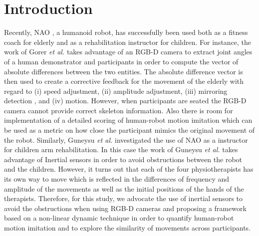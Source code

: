 \documentclass{sig-alternate-05-2015}
\begin{document}


%
%

%
%
\printccsdesc



\section{Introduction}
Recently, NAO \cite{Gouaillier2009}, a humanoid robot, has successfully been used 
both as a fitness coach for elderly and as a rehabilitation instructor for children.
For instance, the work of Gorer \textit{et al.} \cite{Gorer2016} 
takes advantage of an RGB-D camera to extract joint angles of a human demonstrator and participants 
in order to compute the vector of absolute differences between the two entities. 
The absolute difference vector is then used to create a corrective feedback for the movement
of the elderly  with regard to (i) speed adjustment, (ii) amplitude adjustment, (iii) mirroring detection
, and (iv) motion.
However, when participants are seated the RGB-D camera cannot provide correct skeleton information.
Also there is room for implementation of a detailed scoring 
of human-robot motion imitation which can be used as a metric on how close the participant mimics the original movement 
of the robot.
Similarly, Guneysu \textit{et al.} \cite{Guneysu2015} investigated the use of NAO
as a instructor for children arm rehabilitation. 
In this case the work of Guneysu \textit{et al.} takes advantage of 
Inertial sensors in order to avoid obstructions between the robot and the children.
However,  it turns out that each of the four physiotherapists has its own way to move
which is reflected in the differences of frequency and amplitude of the movements
as well as the initial positions of the hands of the therapists.
Therefore, for this study, we advocate the use of inertial sensors to avoid the obstructions when using RGB-D cameras 
\cite{Gorer2016} and proposing a framework based on a non-linear dynamic technique 
in order to quantify human-robot motion imitation 
and to explore the similarity of movements across participants.
\end{document}
